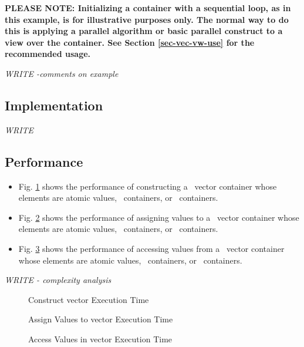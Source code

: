 \textbf{PLEASE NOTE: 
Initializing a container with a sequential loop, as in this example,
is for illustrative purposes only.
The normal way to do this is applying a parallel algorithm or 
basic parallel construct to a view over the container.  See Section
\ref{sec-vec-vw-use}
for the recommended usage.
}

\vspace{0.4cm} \textit{WRITE -comments on example}

\subsection{Implementation} \label{sec-vec-cont-impl}

\textit{WRITE}

\subsection{Performance} \label{sec-vec-cont-perf}

\begin{itemize}
\item
Fig. \ref{fig:vec-cont-constr-exper}
shows the performance of constructing a \stapl\ vector container
whose elements are atomic values, \stl\ containers, or \stapl\ containers.
\item
Fig. \ref{fig:vec-cont-assign-exper}
shows the performance of assigning values to a \stapl\ vector container
whose elements are atomic values, \stl\ containers, or \stapl\ containers.
\item
Fig. \ref{fig:vec-cont-access-exper}
shows the performance of accessing values from a \stapl\ vector container
whose elements are atomic values, \stl\ containers, or \stapl\ containers.
\end{itemize}

\textit{WRITE - complexity analysis}

\begin{figure}[p]
\caption{Construct vector Execution Time}
\label{fig:vec-cont-constr-exper}
\end{figure}

\begin{figure}[p]
\caption{Assign Values to vector Execution Time}
\label{fig:vec-cont-assign-exper}
\end{figure}

\begin{figure}[p]
\caption{Access Values in vector Execution Time}
\label{fig:vec-cont-access-exper}
\end{figure}


